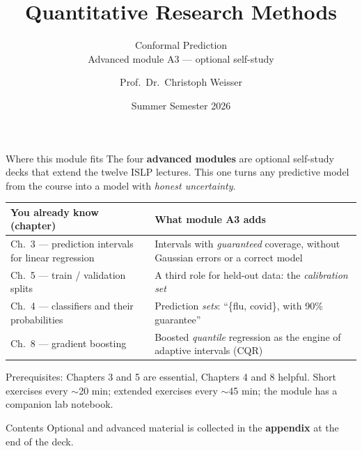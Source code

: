 \documentclass[aspectratio=169,11pt]{beamer}
\title{Quantitative Research Methods}
\subtitle{Conformal Prediction\\[2pt]{\small Advanced module A3 --- optional self-study}}
\author{Prof.\ Dr.\ Christoph Weisser}\institute{HSBI}
\date{Summer Semester 2026}\graphicspath{{images/}}
\begin{document}
\begin{frame}[plain]\titlepage\end{frame}

\begin{frame}{Where this module fits}
  \footnotesize
  The four \textbf{advanced modules} are optional self-study decks that extend the
  twelve ISLP lectures. This one turns any predictive model from the course into a model
  with \emph{honest uncertainty}.
  \begin{center}
  \begin{tabular}{@{}p{4.6cm}p{8.6cm}@{}}
    \toprule
    \textbf{You already know (chapter)} & \textbf{What module A3 adds} \\
    \midrule
    Ch.\ 3 --- prediction intervals for linear regression &
      Intervals with \emph{guaranteed} coverage, without Gaussian errors or a correct
      model \\
    Ch.\ 5 --- train / validation splits &
      A third role for held-out data: the \emph{calibration set} \\
    Ch.\ 4 --- classifiers and their probabilities &
      Prediction \emph{sets}: ``\{flu, covid\}, with 90\% guarantee'' \\
    Ch.\ 8 --- gradient boosting &
      Boosted \emph{quantile} regression as the engine of adaptive intervals (CQR) \\
    \bottomrule
  \end{tabular}
  \end{center}
  \vspace{2pt}
  {\scriptsize Prerequisites: Chapters 3 and 5 are essential, Chapters 4 and 8 helpful.
  Short exercises every $\sim$20 min; extended exercises every $\sim$45 min; the module
  has a companion lab notebook.}
\end{frame}

\begin{frame}{Contents}\small\tableofcontents[hideallsubsections]
  \vfill
  {\tiny Optional and advanced material is collected in the \textbf{appendix} at the end of the deck.}
\end{frame}
\end{document}
